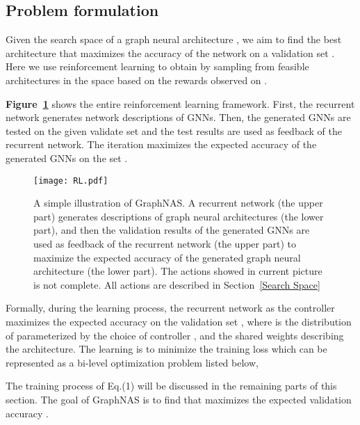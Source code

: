 \documentclass{article}
\begin{document}
\subsection{Problem formulation}
Given the search space of a graph neural architecture , we aim to find the best architecture  that maximizes the accuracy  of the network on a validation set . Here we use reinforcement learning to obtain  by sampling from feasible architectures in the space  based on the rewards   observed on . 

\textbf{Figure~\ref{fig:GraphNAS-RL}} shows the entire reinforcement learning framework. First, the recurrent network generates network descriptions of GNNs. Then, the generated GNNs are tested on the given validate set  and the test results are used as feedback of the recurrent network. The iteration maximizes the expected accuracy of the generated GNNs on the set . 

\label{formulation}
\begin{figure}
	\texttt{[image: RL.pdf]}
	\caption{A simple illustration of GraphNAS. A recurrent network (the upper part) generates descriptions of graph neural architectures (the lower part), and then the validation results of the generated GNNs are used as feedback of the recurrent network (the upper part) to maximize the expected accuracy of the generated graph neural architecture (the lower part). The actions showed in current picture is not complete. All actions are described in Section~\ref{Search Space} }
	\label{fig:GraphNAS-RL}
\end{figure}

Formally, during the learning process, the recurrent network as the controller maximizes the expected accuracy  on the validation set , where  is the distribution of  parameterized by the choice of controller , and the shared weights  describing the architecture. The learning is to minimize the training loss  which can be represented as a bi-level optimization problem listed below, 

\begin{small}
	
\end{small}

The training process of Eq.(1) will be discussed in the remaining parts of this section. The goal of GraphNAS is to find  that maximizes the expected validation accuracy .
\end{document}
